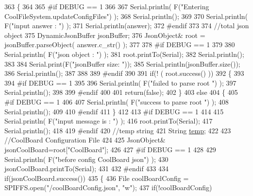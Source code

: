 \begin{DoxyCode}
363 \{
364 
365 \textcolor{preprocessor}{#if DEBUG == 1}
366 
367     Serial.println( F(\textcolor{stringliteral}{"Entering CoolFileSystem.updateConfigFiles"}) );
368     Serial.println();
369     
370     Serial.println( F(\textcolor{stringliteral}{"input answer : "}) );
371     Serial.println(answer);
372 \textcolor{preprocessor}{#endif}
373 
374     \textcolor{comment}{//total json object }
375     DynamicJsonBuffer jsonBuffer;
376     JsonObject& root = jsonBuffer.parseObject( answer.c\_str() );
377 
378 \textcolor{preprocessor}{#if DEBUG == 1}
379     
380     Serial.println( F(\textcolor{stringliteral}{"json object : "}) );  
381     root.printTo(Serial);
382     Serial.println();
383     
384     Serial.print(F(\textcolor{stringliteral}{"jsonBuffer size: "}));
385     Serial.println(jsonBuffer.size());
386     Serial.println();
387 
388 
389 \textcolor{preprocessor}{#endif}
390 
391     \textcolor{keywordflow}{if}(! ( root.success() ))
392     \{
393     
394 \textcolor{preprocessor}{    #if DEBUG == 1}
395 
396         Serial.println( F(\textcolor{stringliteral}{"failed to parse root "}) );
397         Serial.println();
398     
399 \textcolor{preprocessor}{    #endif}
400 
401         \textcolor{keywordflow}{return}(\textcolor{keyword}{false});
402     \}
403     \textcolor{keywordflow}{else}
404     \{
405 \textcolor{preprocessor}{    #if DEBUG == 1}
406         
407         Serial.println( F(\textcolor{stringliteral}{"success to parse root "}) );
408         Serial.println();
409         
410 \textcolor{preprocessor}{    #endif  }
411     \}
412     
413 \textcolor{preprocessor}{#if DEBUG == 1}
414 
415     Serial.println( F(\textcolor{stringliteral}{"input message is : "}) );
416     root.printTo(Serial);
417     Serial.println();
418 
419 \textcolor{preprocessor}{#endif}
420     \textcolor{comment}{//temp string}
421     String \hyperlink{Irene3000_8h_a5905d48604152cf57aa6bfa087b49173}{temp};
422 
423     \textcolor{comment}{//CoolBoard Configuration File}
424 
425         JsonObject& jsonCoolBoard=root[\textcolor{stringliteral}{"CoolBoard"}];
426 
427 \textcolor{preprocessor}{#if DEBUG == 1}
428 
429     Serial.println( F(\textcolor{stringliteral}{"before config CoolBoard json"}) );
430     jsonCoolBoard.printTo(Serial);
431 
432 \textcolor{preprocessor}{#endif}
433 
434     \textcolor{keywordflow}{if}(jsonCoolBoard.success())
435     \{
436         File coolBoardConfig = SPIFFS.open(\textcolor{stringliteral}{"/coolBoardConfig.json"}, \textcolor{stringliteral}{"w"});   
437         \textcolor{keywordflow}{if}(!coolBoardConfig)

\end{DoxyCode}

